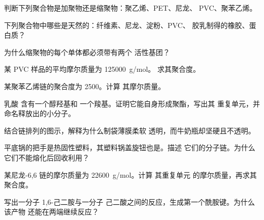 \begin{exercise}[$\star$]\label{exo:g12:polymers:3}
判断下列聚合物是加聚物还是缩聚物：聚乙烯、PET、尼龙、
PVC、聚苯乙烯。
\end{exercise}

\begin{exercise}[$\star$]\label{exo:g12:polymers:4}
下列聚合物中哪些是天然的：纤维素、尼龙、淀粉、PVC、
胶乳制得的橡胶、蛋白质？
\end{exercise}

\begin{exercise}[$\star$]\label{exo:g12:polymers:5}
为什么缩聚物的每个单体都必须带有两个
活性基团？
\end{exercise}

\begin{exercise}[$\star\star$]\label{exo:g12:polymers:6}
某 PVC 样品的平均摩尔质量为 \qty{125000}{g/mol}。
求其聚合度。
\end{exercise}

\begin{exercise}[$\star\star$]\label{exo:g12:polymers:7}
某聚苯乙烯链的聚合度为 2500。计算
其摩尔质量。
\end{exercise}

\begin{exercise}[$\star\star$]\label{exo:g12:polymers:8}
乳酸  含有一个醇羟基和
一个羧基。证明它能自身形成聚酯，写出其
重复单元，并命名释放出的小分子。
\end{exercise}

\begin{exercise}[$\star\star$]\label{exo:g12:polymers:9}
结合链排列的图示，解释为什么制袋薄膜柔软
透明，而牛奶瓶却坚硬且不透明。
\end{exercise}

\begin{exercise}[$\star\star$]\label{exo:g12:polymers:10}
平底锅的把手是热固性塑料，其塑料锅盖旋钮也是。描述
它们的分子链。为什么它们不能熔化后回收利用？
\end{exercise}

\begin{exercise}[$\star\star$]\label{exo:g12:polymers:11}
某尼龙-6,6 链的摩尔质量为 \qty{22600}{g/mol}。计算
其重复单元  的摩尔质量，再求其
聚合度。
\end{exercise}

\begin{exercise}[$\star\star\star$]\label{exo:g12:polymers:12}
写出一分子 1,6-己二胺与一分子
己二酸之间的反应，生成第一个酰胺键。为什么该产物
还能在两端继续反应？
\end{exercise}

